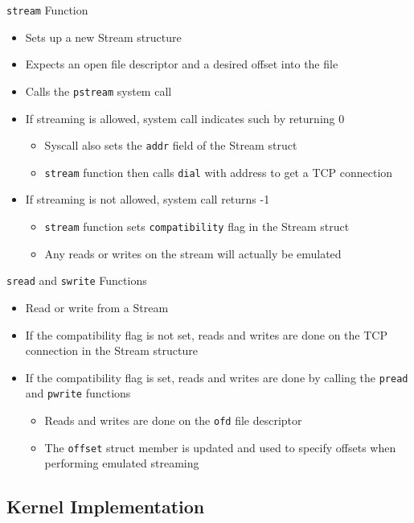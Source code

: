 \documentclass[11pt,compress]{beamer}
\begin{document}
\begin{frame}{{\tt stream} Function}
\begin{itemize}
	\item Sets up a new Stream structure
	\item Expects an open file descriptor and a desired offset into the file
	\item Calls the {\tt pstream} system call
	\item If streaming is allowed, system call indicates such by returning 0
	\begin{itemize}
		\item Syscall also sets the {\tt addr} field of the Stream struct
		\item {\tt stream} function then calls {\tt dial} with address to get a TCP connection
	\end{itemize}
	\item If streaming is not allowed, system call returns -1
	\begin{itemize}
		\item {\tt stream} function sets {\tt compatibility} flag in the Stream struct
		\item Any reads or writes on the stream will actually be emulated
	\end{itemize}
\end{itemize}
\end{frame}

\begin{frame}{{\tt sread} and {\tt swrite} Functions}
\begin{itemize}
	\item Read or write from a Stream
	\item If the compatibility flag is not set, reads and writes are done on the TCP connection in the Stream structure
	\item If the compatibility flag is set, reads and writes are done by calling the {\tt pread} and {\tt pwrite} functions
	\begin{itemize}
		\item Reads and writes are done on the {\tt ofd} file descriptor
		\item The {\tt offset} struct member is updated and used to specify offsets when performing emulated streaming
	\end{itemize}
\end{itemize}
\end{frame}

\subsection{Kernel Implementation}
\end{document}
